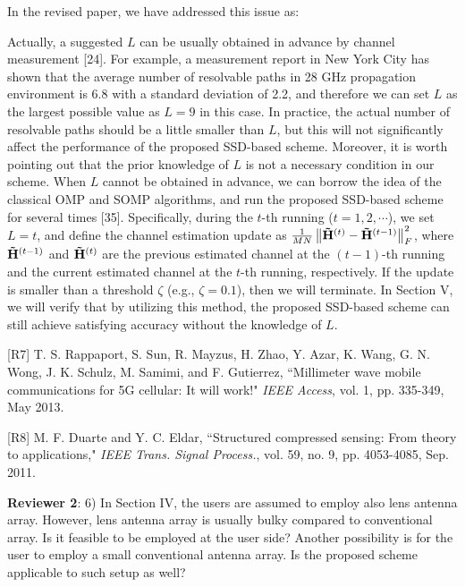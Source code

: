 \documentclass[a4paper,12pt]{article}
\begin{document}
{In the revised paper, we have addressed this issue as:
\begin{framed}
{\color{red} Actually, a suggested ${L}$ can be usually obtained in advance by channel measurement [24]. For example, a measurement report in New York City has shown that the average number of resolvable paths in 28 GHz propagation environment is 6.8 with a standard deviation of 2.2, and therefore we can set ${L}$ as the largest possible value as ${L = 9}$ in this case. In practice, the actual number of resolvable paths should be a little smaller than ${L}$, but this will not significantly affect the performance of the proposed SSD-based scheme. Moreover, it is worth pointing out that the prior knowledge of ${L}$ is not a necessary condition in our scheme. When ${L}$ cannot be obtained in advance, we can borrow the idea of the classical OMP and SOMP algorithms, and run the proposed SSD-based scheme for several times [35]. Specifically, during the ${t}$-th running (${t = 1,2, \cdots }$), we set ${L = t}$, and define the channel estimation update as ${\frac{1}{{MN}}\left\| {{{{\bf{\tilde H}}}^{\left( t \right)}} - {{{\bf{\tilde H}}}^{\left( {t - 1} \right)}}} \right\|_F^2}$, where ${{{{{\bf{\tilde H}}}^{\left( {t - 1} \right)}}}}$ and ${{{{{\bf{\tilde H}}}^{\left( t \right)}}}}$ are the previous estimated channel at the ${\left( {t - 1} \right)}$-th running and the current estimated channel at the ${t}$-th running, respectively. If the update is smaller than a threshold ${\zeta }$ (e.g., ${\zeta = 0.1}$), then we will terminate. In Section V, we will verify that by utilizing this method, the proposed SSD-based scheme can still achieve satisfying accuracy without the knowledge of ${L}$.}
\end{framed}




[R7] T. S. Rappaport, S. Sun, R. Mayzus, H. Zhao, Y. Azar, K. Wang, G. N. Wong, J. K. Schulz, M. Samimi, and F. Gutierrez, ``Millimeter wave mobile communications for 5G cellular: It will work!" {\it IEEE Access}, vol. 1, pp. 335-349, May 2013.

[R8] M. F. Duarte and Y. C. Eldar, ``Structured compressed sensing: From theory to applications," {\it IEEE Trans. Signal Process.}, vol. 59, no. 9, pp. 4053-4085, Sep. 2011.

}

\textbf{Reviewer 2}: 6) In Section IV, the users are assumed to employ also lens antenna array. However, lens antenna array is usually bulky compared to conventional array. Is it feasible to be employed at the user side? Another possibility is for the user to employ a small conventional antenna array. Is the proposed scheme applicable to such setup as well?
\end{document}

